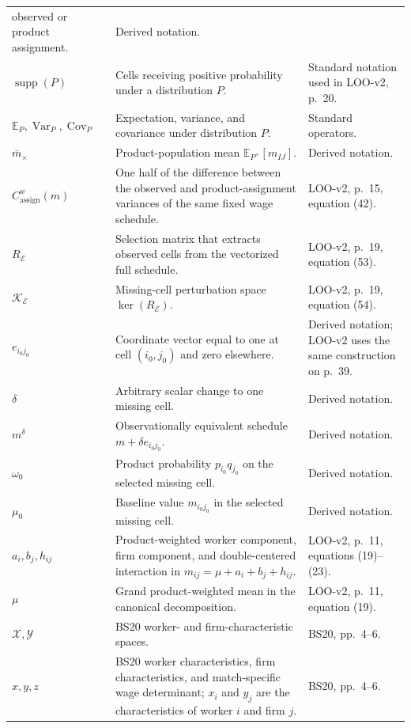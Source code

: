 \documentclass[11pt]{article}
\begin{document}
\begin{longtable}{p{}p{}p{}}
observed or product assignment. & Derived notation. \\
\(\operatorname{supp}(P)\) & Cells receiving positive probability under a
distribution \(P\). & Standard notation used in LOO-v2, p.\ 20. \\
\(\mathbb E_P,\operatorname{Var}_P,\operatorname{Cov}_P\) & Expectation,
variance, and covariance under distribution \(P\). & Standard operators. \\
\(\bar m_\times\) & Product-population mean
\(\mathbb E_{P^\times}[m_{IJ}]\). & Derived notation. \\
\(C^w_{\mathrm{assign}}(m)\) & One half of the difference between the observed
and product-assignment variances of the same fixed wage schedule. &
LOO-v2, p.\ 15, equation (42). \\
\(R_{\mathcal E}\) & Selection matrix that extracts observed cells from the
vectorized full schedule. & LOO-v2, p.\ 19, equation (53). \\
\(\mathcal K_{\mathcal E}\) & Missing-cell perturbation space
\(\ker(R_{\mathcal E})\). & LOO-v2, p.\ 19, equation (54). \\
\(e_{i_0j_0}\) & Coordinate vector equal to one at cell \((i_0,j_0)\) and zero
elsewhere. & Derived notation; LOO-v2 uses the same construction on p.\ 39. \\
\(\delta\) & Arbitrary scalar change to one missing cell. & Derived notation. \\
\(m^\delta\) & Observationally equivalent schedule
\(m+\delta e_{i_0j_0}\). & Derived notation. \\
\(\omega_0\) & Product probability \(p_{i_0}q_{j_0}\) on the selected missing
cell. & Derived notation. \\
\(\mu_0\) & Baseline value \(m_{i_0j_0}\) in the selected missing cell. &
Derived notation. \\
\(a_i,b_j,h_{ij}\) & Product-weighted worker component, firm component, and
double-centered interaction in
\(m_{ij}=\mu+a_i+b_j+h_{ij}\). & LOO-v2, p.\ 11, equations (19)--(23). \\
\(\mu\) & Grand product-weighted mean in the canonical decomposition. &
LOO-v2, p.\ 11, equation (19). \\
\(\mathcal X,\mathcal Y\) & BS20 worker- and firm-characteristic spaces. &
BS20, pp.\ 4--6. \\
\(x,y,z\) & BS20 worker characteristics, firm characteristics, and
match-specific wage determinant; \(x_i\) and \(y_j\) are the characteristics
of worker \(i\) and firm \(j\). & BS20, pp.\ 4--6. \\

\end{longtable}
\end{document}
